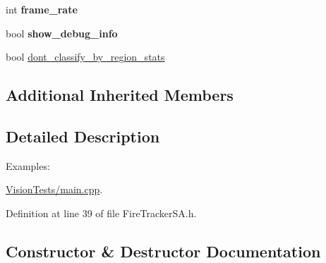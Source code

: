\begin{DoxyCompactItemize}
\item 
\hypertarget{class_fire_tracker_s_a_a30b38dbacfbdef6a3e9a33f6feefb6cc}{}int {\bfseries frame\+\_\+rate}\label{class_fire_tracker_s_a_a30b38dbacfbdef6a3e9a33f6feefb6cc}

\item 
\hypertarget{class_fire_tracker_s_a_abc06dfc966087167fe1237e12a3eb36d}{}bool {\bfseries show\+\_\+debug\+\_\+info}\label{class_fire_tracker_s_a_abc06dfc966087167fe1237e12a3eb36d}

\item 
bool \hyperlink{class_fire_tracker_s_a_abc9326cea4683208d23aa1854bf6cd89}{dont\+\_\+classify\+\_\+by\+\_\+region\+\_\+stats}
\end{DoxyCompactItemize}
\subsection*{Additional Inherited Members}


\subsection{Detailed Description}
\begin{Desc}
\item[Examples\+: ]\par
\hyperlink{_vision_tests_2main_8cpp-example}{Vision\+Tests/main.\+cpp}.\end{Desc}


Definition at line 39 of file Fire\+Tracker\+S\+A.\+h.



\subsection{Constructor \& Destructor Documentation}
\hypertarget{class_fire_tracker_s_a_a84a670238d047b32a9c891e663af11a4}{}
